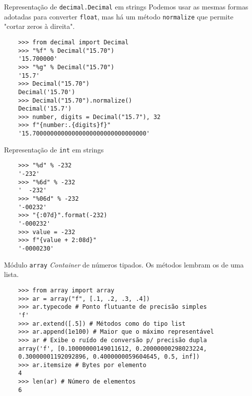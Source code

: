 \documentclass[utf8]{beamer}
\begin{document}
\begin{frame}[fragile]{Representação de \texttt{decimal.Decimal}
                       em strings}
  Podemos usar as mesmas formas adotadas
  para converter \texttt{float},
  mas há um método \texttt{normalize}
  que permite "cortar zeros à direita".

  \begin{verbatim}
    >>> from decimal import Decimal
    >>> "%f" % Decimal("15.70")
    '15.700000'
    >>> "%g" % Decimal("15.70")
    '15.7'
    >>> Decimal("15.70")
    Decimal('15.70')
    >>> Decimal("15.70").normalize()
    Decimal('15.7')
    >>> number, digits = Decimal("15.7"), 32
    >>> f"{number:.{digits}f}"
    '15.70000000000000000000000000000000'
  \end{verbatim}

\end{frame}


\begin{frame}[fragile]{Representação de \texttt{int} em strings}
  \begin{verbatim}
    >>> "%d" % -232
    '-232'
    >>> "%6d" % -232
    '  -232'
    >>> "%06d" % -232
    '-00232'
    >>> "{:07d}".format(-232)
    '-000232'
    >>> value = -232
    >>> f"{value + 2:08d}"
    '-0000230'
  \end{verbatim}
\end{frame}


\begin{frame}[fragile]{Módulo \texttt{array}}
  \emph{Container} de números tipados.
  Os métodos lembram os de uma lista.

  \begin{verbatim}
    >>> from array import array
    >>> ar = array("f", [.1, .2, .3, .4])
    >>> ar.typecode # Ponto flutuante de precisão simples
    'f'
    >>> ar.extend([.5]) # Métodos como do tipo list
    >>> ar.append(1e100) # Maior que o máximo representável
    >>> ar # Exibe o ruído de conversão p/ precisão dupla
    array('f', [0.10000000149011612, 0.20000000298023224,
    0.30000001192092896, 0.4000000059604645, 0.5, inf])
    >>> ar.itemsize # Bytes por elemento
    4
    >>> len(ar) # Número de elementos
    6
  \end{verbatim}

\end{frame}
\end{document}
